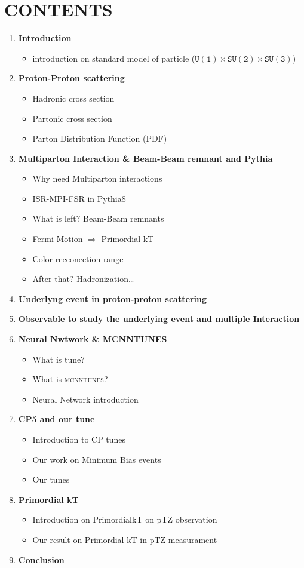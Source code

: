\documentclass[10pt]{article}
\begin{document}
\section*{CONTENTS}

\begin{enumerate}[label=\arabic*)]
\item \textbf{Introduction} 
	\begin{itemize}
		\item introduction on standard model of particle ($\mathtt{U(1)\times SU(2)\times SU(3)}$)
	\end{itemize}
\item \textbf{Proton-Proton scattering}
	\begin{itemize}
		\item Hadronic cross section 
		\item Partonic cross section
		\item Parton Distribution Function (PDF)
	\end{itemize}
\item \textbf{Multiparton Interaction \& Beam-Beam remnant and Pythia}
	\begin{itemize}
		\item Why need Multiparton interactions
		\item ISR-MPI-FSR in Pythia8
		\item What is left? Beam-Beam remnants
		\item Fermi-Motion $\Rightarrow$ Primordial kT
		\item Color recconection range
		\item After that? Hadronization\dots
	\end{itemize}
\item \textbf{Underlyng event in proton-proton scattering}
\item \textbf{Observable to study the underlying event and multiple Interaction}
\item \textbf{Neural Nwtwork \& MCNNTUNES}
\begin{itemize}
	\item What is tune?
	\item What is \textsc{mcnntunes}?
	\item Neural Network introduction
\end{itemize}
\item \textbf{CP5 and our tune}
\begin{itemize}
	\item Introduction to CP tunes
	\item Our work on Minimum Bias events
	\item Our tunes
\end{itemize}
\item \textbf{Primordial kT}
\begin{itemize}
	\item Introduction on PrimordialkT on pTZ observation
	\item Our result on Primordial kT in pTZ measurament 
\end{itemize}
\item \textbf{Conclusion}
\end{enumerate}
\end{document}
